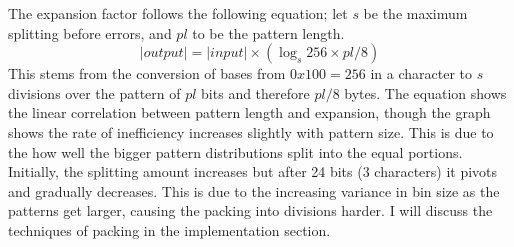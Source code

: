\documentclass[ %
                    author={Samuel Russell},
                supervisor={Prof. Bogdan Warinschi},
                    degree={MEng},
                     title={Innocuous Ciphertexts},
                  subtitle={The DE-CENSOR Scheme},
                      type={research},
                      year={2018} ]{dissertation}
\begin{document}
%
%

The expansion factor follows the following equation; let $s$ be the maximum splitting before errors, and $pl$ to be the pattern length.
$$|output| = |input| \times \left( \log_s 256 \times pl / 8 \right)$$
This stems from the conversion of bases from $0x100=256$ in a character to $s$ divisions over the pattern of $pl$ bits and therefore $pl/8$ bytes. The equation shows the linear correlation between pattern length and expansion, though the graph shows the rate of inefficiency increases slightly with pattern size. This is due to the how well the bigger pattern distributions split into the equal portions. Initially, the splitting amount increases but after 24 bits (3 characters) it pivots and gradually decreases.  This is due to the increasing variance in bin size as the patterns get larger, causing the packing into divisions harder. I will discuss the techniques of packing in the implementation section.
\end{document}
